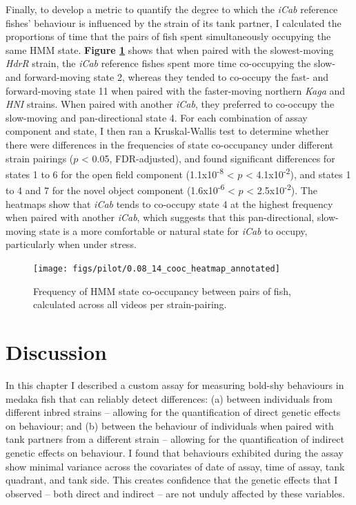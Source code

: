 \documentclass[
]{book}
\begin{document}
Finally, to develop a metric to quantify the degree to which the \emph{iCab} reference fishes' behaviour is influenced by the strain of its tank partner, I calculated the proportions of time that the pairs of fish spent simultaneously occupying the same HMM state. \textbf{Figure \ref{fig:pilot-cooc-heat}} shows that when paired with the slowest-moving \emph{HdrR} strain, the \emph{iCab} reference fishes spent more time co-occupying the slow- and forward-moving state 2, whereas they tended to co-occupy the fast- and forward-moving state 11 when paired with the faster-moving northern \emph{Kaga} and \emph{HNI} strains. When paired with another \emph{iCab}, they preferred to co-occupy the slow-moving and pan-directional state 4. For each combination of assay component and state, I then ran a Kruskal-Wallis test to determine whether there were differences in the frequencies of state co-occupancy under different strain pairings (\(p\) \textless{} 0.05, FDR-adjusted), and found significant differences for states 1 to 6 for the open field component (1.1x10\textsuperscript{-8} \textless{} \(p\) \textless{} 4.1x10\textsuperscript{-2}), and states 1 to 4 and 7 for the novel object component (1.6x10\textsuperscript{-6} \textless{} \(p\) \textless{} 2.5x10\textsuperscript{-2}). The heatmaps show that \emph{iCab} tends to co-occupy state 4 at the highest frequency when paired with another \emph{iCab}, which suggests that this pan-directional, slow-moving state is a more comfortable or natural state for \emph{iCab} to occupy, particularly when under stress.



\begin{figure}
\texttt{[image: figs/pilot/0.08\_14\_cooc\_heatmap\_annotated]} \caption{Frequency of HMM state co-occupancy between pairs of fish, calculated across all videos per strain-pairing.}\label{fig:pilot-cooc-heat}
\end{figure}

\hypertarget{discussion-1}{%
\section{Discussion}\label{discussion-1}}

In this chapter I described a custom assay for measuring bold-shy behaviours in medaka fish that can reliably detect differences: (a) between individuals from different inbred strains -- allowing for the quantification of direct genetic effects on behaviour; and (b) between the behaviour of individuals when paired with tank partners from a different strain -- allowing for the quantification of indirect genetic effects on behaviour. I found that behaviours exhibited during the assay show minimal variance across the covariates of date of assay, time of assay, tank quadrant, and tank side. This creates confidence that the genetic effects that I observed -- both direct and indirect -- are not unduly affected by these variables.
\end{document}
